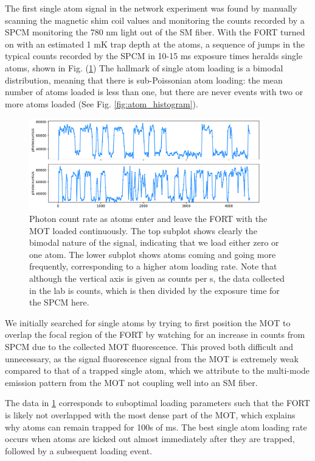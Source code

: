 The first single atom signal in the network experiment was found by manually scanning the magnetic shim coil values and monitoring the counts recorded by a SPCM monitoring the 780 nm light out of the SM fiber. With the FORT turned on with an estimated 1 mK trap depth at the atoms, a sequence of jumps in the typical counts recorded by the SPCM in 10-15 ms exposure times heralds single atoms, shown in Fig. (\ref{fig:atoms_loaded_steady_state}) The hallmark of single atom loading is a bimodal distribution, meaning that there is sub-Poissonian atom loading: the mean number of atoms loaded is less than one, but there are never events with two or more atoms loaded (See Fig. \ref{fig:atom_histogram}).
\begin{figure}[!ht]
    \centering
    \includegraphics[width=0.9\textwidth]{Images/2024-06-21_atom_loading_with_continuous_MOT_time_series_loading_comparison_aspect0.02.pdf}
    \caption{Photon count rate as atoms enter and leave the FORT with the MOT loaded continuously. The top subplot shows clearly the bimodal nature of the signal, indicating that we load either zero or one atom. The lower subplot shows atoms coming and going more frequently, corresponding to a higher atom loading rate. Note that although the vertical axis is given
    as counts per s, the data collected in the lab is counts, 
    which is then divided by the exposure time for the SPCM here.}
    \label{fig:atoms_loaded_steady_state}
\end{figure}
We initially searched for single atoms by trying to first position the MOT to overlap the focal region of the FORT by watching for an increase in counts from SPCM due to the collected MOT fluorescence. This proved both difficult and unnecessary, as the signal fluorescence signal from the MOT is extremely weak compared to that of a trapped single atom, which we attribute to the multi-mode emission pattern from the MOT not coupling well into an SM fiber. 

The data in \ref{fig:atoms_loaded_steady_state} corresponds to suboptimal loading parameters such that the FORT is likely not overlapped with the most dense part of the MOT, which explains why atoms can remain trapped for 100s of ms. The best single atom loading rate occurs when atoms are kicked out almost immediately after they are trapped, followed by a subsequent loading event.

